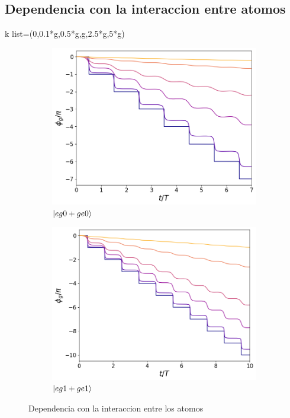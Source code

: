 \subsection{Dependencia con la interaccion entre atomos}
k list=(0,0.1*g,0.5*g,g,2.5*g,5*g)


\begin{figure}[h]
    \centering
    \begin{subfigure}{0.49\textwidth}
        \includegraphics[width=\textwidth]{figuras/ch5/dependencia/eg0+/interaccion todo 0.png}
        \caption{$\ket{eg0+ge0}$}
        \label{fig5:dependencia interaccion eg0}
    \end{subfigure}
    \hfill
    \begin{subfigure}{0.49\textwidth}
        \includegraphics[width=\textwidth]{figuras/ch5/dependencia/eg1+/interaccion todo 0.png}
        \caption{$\ket{eg1+ge1}$}
        \label{fig5:dependencia interaccion eg1}
    \end{subfigure}
    \caption{Dependencia con la interaccion entre los atomos}
    \label{fig5:dependencia interaccion}
\end{figure}

